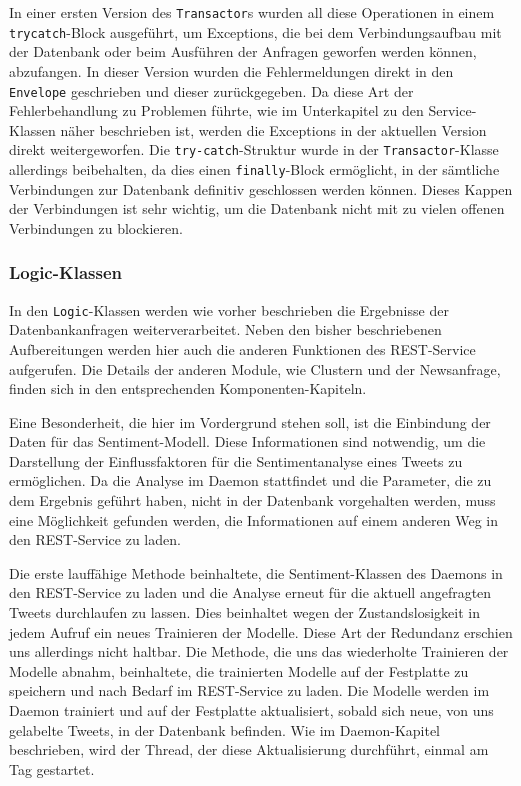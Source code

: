 In einer ersten Version des \texttt{Transactor}s wurden all diese Operationen in einem \texttt{try\-catch}-Block ausgeführt, um Exceptions, die bei dem Verbindungsaufbau mit der Datenbank oder beim Ausführen der Anfragen geworfen werden können, abzufangen. In dieser Version wurden die Fehlermeldungen direkt in den \texttt{Envelope} geschrieben und dieser zurückgegeben. Da diese Art der Fehlerbehandlung zu Problemen führte, wie im Unterkapitel zu den Service-Klassen näher beschrieben ist, werden die Exceptions in der aktuellen Version direkt weitergeworfen. Die \texttt{try-catch}-Struktur wurde in der \texttt{Transactor}-Klasse allerdings beibehalten, da dies einen \texttt{finally}-Block ermöglicht, in der sämtliche Verbindungen zur Datenbank definitiv geschlossen werden können. Dieses Kappen der Verbindungen ist sehr wichtig, um die Datenbank nicht mit zu vielen offenen Verbindungen zu blockieren.

\subsubsection{Logic-Klassen}
In den \texttt{Logic}-Klassen werden wie vorher beschrieben die Ergebnisse der Datenbankanfragen weiterverarbeitet. Neben den bisher beschriebenen Aufbereitungen werden hier auch die anderen Funktionen des REST-Service aufgerufen. Die Details der anderen Module, wie Clustern und der Newsanfrage, finden sich in den entsprechenden Komponenten-Kapiteln. 

Eine Besonderheit, die hier im Vordergrund stehen soll, ist die Einbindung der Daten für das Sentiment-Modell. Diese Informationen sind notwendig, um die Darstellung der Einflussfaktoren für die Sentimentanalyse eines Tweets zu ermöglichen. Da die Analyse im Daemon stattfindet und die Parameter, die zu dem Ergebnis geführt haben, nicht in der Datenbank vorgehalten werden, muss eine Möglichkeit gefunden werden, die Informationen auf einem anderen Weg in den REST-Service zu laden.

Die erste lauffähige Methode beinhaltete, die Sentiment-Klassen des Daemons in den REST-Service zu laden und die Analyse erneut für die aktuell angefragten Tweets durchlaufen zu lassen. Dies beinhaltet wegen der Zustandslosigkeit in jedem Aufruf ein neues Trainieren der Modelle. Diese Art der Redundanz erschien uns allerdings nicht haltbar. Die Methode, die uns das wiederholte Trainieren der Modelle abnahm, beinhaltete, die trainierten Modelle auf der Festplatte zu speichern und nach Bedarf im REST-Service zu laden. Die Modelle werden im Daemon trainiert und auf der Festplatte aktualisiert, sobald sich neue, von uns gelabelte Tweets, in der Datenbank befinden. Wie im 
 Daemon-Kapitel beschrieben, wird der Thread, der diese Aktualisierung durchführt, einmal am Tag gestartet.
 
